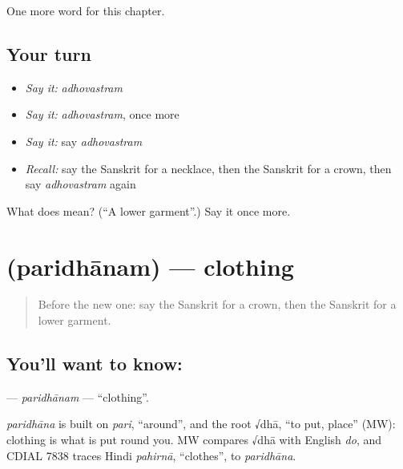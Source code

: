 \begin{grammarlens}[title={What you've built}]
One more word for this chapter.
\end{grammarlens}

\subsection*{Your turn}
\begin{itemize}
\raggedright
  \item \emph{Say it:} \emph{adhovastram}
  \item \emph{Say it:} \emph{adhovastram}, once more
  \item \emph{Say it:} say \emph{adhovastram}
  \item \emph{Recall:} say the Sanskrit for a necklace, then the Sanskrit for a crown, then say \emph{adhovastram} again
\end{itemize}

\begin{tcolorbox}[breakable,colback=teal!4,colframe=teal!35!black,title={Before you move on}]
What does  mean? (\textquotedblleft{}A lower garment\textquotedblright{}.) Say it once more.
\end{tcolorbox}
\section[\texorpdfstring{\sk{परिधानम्} (paridhānam)}{परिधानम् (paridhānam)}]{ (paridhānam) — clothing}

\label{lesson:SA-C192-paridhanam}



\begin{quote}
Before the new one: say the Sanskrit for a crown, then the Sanskrit for a lower garment.
\end{quote}

\subsection*{You'll want to know: }
\textbf{} — \emph{paridhānam} — \textquotedblleft{}clothing\textquotedblright{}.

\begin{cousinweb}
\emph{paridhāna} is built on \emph{pari}, \textquotedblleft{}around\textquotedblright{}, and the root √dhā, \textquotedblleft{}to put, place\textquotedblright{} (MW): clothing is what is put round you. MW compares √dhā with English \emph{do}, and CDIAL 7838 traces Hindi \emph{pahirnā}, \textquotedblleft{}clothes\textquotedblright{}, to \emph{paridhāna}.
\end{cousinweb}

